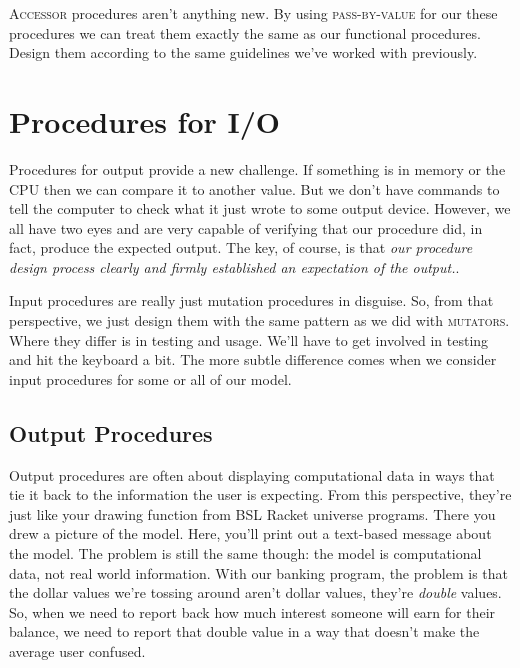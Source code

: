 \textsc{Accessor} procedures aren't anything new. By using \textsc{pass-by-value} for our these procedures we can treat them exactly the same as our functional procedures. Design them according to the same guidelines we've worked with previously. 

\section{Procedures for I/O}

Procedures for output provide a new challenge. If something is in memory or the CPU then we can compare it to another value. But we don't have commands to tell the computer to check what it just wrote to some output device.  However, we all have two eyes and are very capable of verifying that our procedure did, in fact, produce the expected output. The key, of course, is that \textit{our procedure design process clearly and firmly established an expectation of the output.}.

Input procedures are really just mutation procedures in disguise. So, from that perspective, we just design them with the same pattern as we did with \textsc{mutators}.  Where they differ is in testing and usage.  We'll have to get involved in testing and hit the keyboard a bit. The more subtle difference comes when we consider input procedures for some or all of our model. 

\subsection{Output Procedures}

Output procedures are often about displaying computational data in ways that tie it back to the information the user is expecting. From this perspective, they're just like your drawing function from BSL Racket universe programs. There you drew a picture of the model. Here, you'll print out a text-based message about the model. The problem is still the same though: the model is computational data, not real world information. With our banking program, the problem is that the dollar values we're tossing around aren't dollar values, they're \textit{double} values. So, when we need to report back how much interest someone will earn for their balance, we need to report that double value in a way that doesn't make the average user confused.

